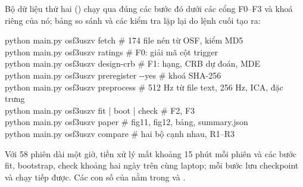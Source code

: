 Bộ dữ liệu thứ hai () chạy qua đúng các bước đó dưới các cổng F0--F3 và khoá riêng của nó; bảng so sánh  và các kiểm tra lặp lại do lệnh cuối tạo ra:
\begin{tcolorbox}[algbox]
\small\ttfamily
python main.py osf3uszv fetch \quad \# 174 file nén từ OSF, kiểm MD5\\
python main.py osf3uszv ratings \quad \# F0: giải mã cột trigger\\
python main.py osf3uszv design-crb \quad \# F1: hạng, CRB dự đoán, MDE\\
python main.py osf3uszv preregister -{}-yes \quad \# khoá SHA-256\\
python main.py osf3uszv preprocess \quad \# 512 Hz từ file text, 256 Hz, ICA, đặc trưng\\
python main.py osf3uszv fit | boot | check \quad \# F2, F3\\
python main.py osf3uszv paper \quad \# fig11, fig12, bảng, summary.json\\
python main.py osf3uszv compare \quad \# hai bộ cạnh nhau, R1--R3
\end{tcolorbox}
Với 58 phiên dài một giờ, tiền xử lý mất khoảng 15 phút mỗi phiên và các bước fit, bootstrap, check khoảng hai ngày trên cùng laptop; mỗi bước lưu checkpoint và chạy tiếp được. Các con số của  nằm trong  và .

